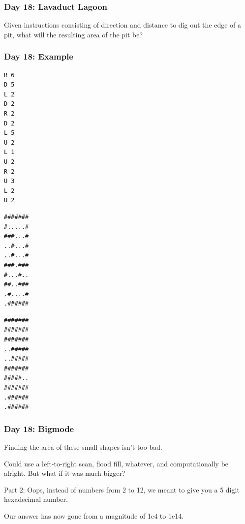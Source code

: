 \begin{frame}
\frametitle{Day 18: Lavaduct Lagoon}

    \begin{center}
        Given instructions consisting of direction and distance to dig out the edge of a pit, what will the resulting area of the pit be?
    \end{center}

\end{frame}

\begin{frame}[fragile]
\frametitle{Day 18: Example}
    
    \begin{center}
        \begin{minipage}{0.3\textwidth}
        \begin{center}
        \begin{verbatim}
R 6
D 5
L 2
D 2
R 2
D 2
L 5
U 2
L 1
U 2
R 2
U 3
L 2
U 2
        \end{verbatim}
        \end{center}
        \end{minipage}
        \begin{minipage}{0.3\textwidth}
        \begin{center}
        \begin{verbatim}
#######
#.....#
###...#
..#...#
..#...#
###.###
#...#..
##..###
.#....#
.######
        \end{verbatim}
        \end{center}
        \end{minipage}
        \begin{minipage}{0.3\textwidth}
            \begin{center}
            \begin{verbatim}
#######
#######
#######
..#####
..#####
#######
#####..
#######
.######
.######
            \end{verbatim}
            \end{center}
            \end{minipage}
    \end{center}
    \vfill

\end{frame}

\begin{frame}
\frametitle{Day 18: Bigmode}

Finding the area of these small shapes isn't too bad.\vfill

Could use a left-to-right scan, flood fill, whatever, and computationally be alright. But what if it was much bigger?\vfill

Part 2: Oops, instead of numbers from 2 to 12, we meant to give you a 5 digit hexadecimal number.\vfill

Our answer has now gone from a magnitude of 1e4 to 1e14.\vfill

\end{frame}

